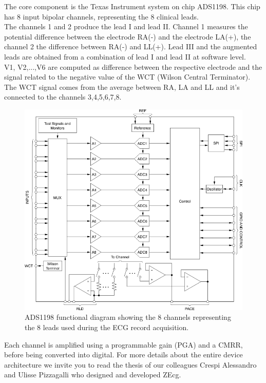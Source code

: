 The core component is the Texas Instrument system on chip ADS1198. This chip has 8 input bipolar channels, representing the 8 clinical leads.\\
The channels 1 and 2 produce the lead I and lead II. Channel 1 measures the potential difference between the electrode RA(-) and the electrode LA(+), the channel 2 the difference between RA(-) and LL(+). Lead III and the augmented leads are obtained from a combination of lead I and lead II at software level.\\
V1, V2,...,V6 are computed as difference between the respective electrode and the signal related to the negative value of the WCT (Wilson Central Terminator).\\
The WCT signal comes from the average between RA, LA and LL and it's connected to the channels 3,4,5,6,7,8.
\begin{figure}[ht!]
	\centering
	\includegraphics[width=120mm]{figures/ch8/2.png}
	\caption{ADS1198 functional diagram showing the 8 channels representing the 8 leads used during the ECG record acquisition.}
	\label{fig8.2}
\end{figure}
Each channel is amplified using a programmable gain (PGA) and a CMRR, before being converted into digital. For more details about the entire device architecture we invite you to read the thesis of our colleagues Crespi Alessandro and Ulisse Pizzagalli\cite{ref22} who designed and developed ZEcg.
